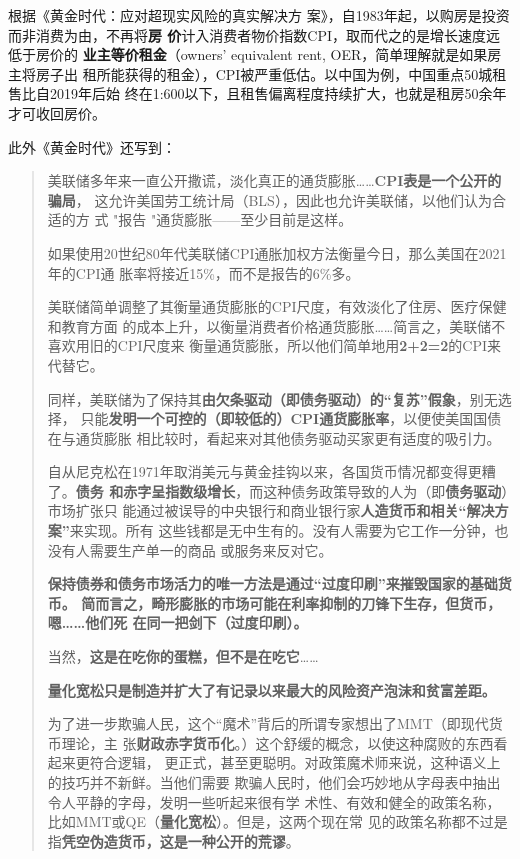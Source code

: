 根据《黄金时代：应对超现实风险的真实解决方
案》\cite{piepenburg2022gold}，自1983年起，以购房是投资而非消费为由，不再将\textbf{房
  价}计入消费者物价指数CPI，取而代之的是增长速度远低于房价的%
\textbf{业主等价租金}（owners’ equivalent rent, OER，简单理解就是如果房主将房子出
租所能获得的租金），CPI被严重低估。以中国为例，中国重点50城租售比自2019年后始
终在1:600以下，且租售偏离程度持续扩大，也就是租房50余年才可收回房价。


此外《黄金时代》还写到：
\begin{quotation}
  美联储多年来一直公开撒谎，淡化真正的通货膨胀……\textbf{CPI表是一个公开的骗局}，
  这允许美国劳工统计局（BLS），因此也允许美联储，以他们认为合适的方
  式 "报告 "通货膨胀——至少目前是这样。

  如果使用20世纪80年代美联储CPI通胀加权方法衡量今日，那么美国在2021年的CPI通
  胀率将接近15\%，而不是报告的6\%多。

  美联储简单调整了其衡量通货膨胀的CPI尺度，有效淡化了住房、医疗保健和教育方面
  的成本上升，以衡量消费者价格通货膨胀……简言之，美联储不喜欢用旧的CPI尺度来
  衡量通货膨胀，所以他们简单地用\textbf{2+2=2}的CPI来代替它。

  同样，美联储为了保持其\textbf{由欠条驱动（即债务驱动）的“复苏”假象}，别无选择，
  只能\textbf{发明一个可控的（即较低的）CPI通货膨胀率}，以便使美国国债在与通货膨胀
  相比较时，看起来对其他债务驱动买家更有适度的吸引力。

  自从尼克松在1971年取消美元与黄金挂钩以来，各国货币情况都变得更糟了。\textbf{债务
    和赤字呈指数级增长}，而这种债务政策导致的人为（即\textbf{债务驱动}）市场扩张只
  能通过被误导的中央银行和商业银行家\textbf{人造货币和相关“解决方案”}来实现。所有
  这些钱都是无中生有的。没有人需要为它工作一分钟，也没有人需要生产单一的商品
  或服务来反对它。

  \textbf{保持债券和债务市场活力的唯一方法是通过“过度印刷”来摧毁国家的基础货币。
    简而言之，畸形膨胀的市场可能在利率抑制的刀锋下生存，但货币，嗯……他们死
    在同一把剑下（过度印刷）。}

  当然，\textbf{这是在吃你的蛋糕，但不是在吃它}……


  \textbf{量化宽松只是制造并扩大了有记录以来最大的风险资产泡沫和贫富差距。}

  为了进一步欺骗人民，这个“魔术”背后的所谓专家想出了MMT（即现代货币理论，主
  张\textbf{财政赤字货币化}。）这个舒缓的概念，以使这种腐败的东西看起来更符合逻辑，
  更正式，甚至更聪明。对政策魔术师来说，这种语义上的技巧并不新鲜。当他们需要
  欺骗人民时，他们会巧妙地从字母表中抽出令人平静的字母，发明一些听起来很有学
  术性、有效和健全的政策名称，比如MMT或QE（\textbf{量化宽松}）。但是，这两个现在常
  见的政策名称都不过是指\textbf{凭空伪造货币，这是一种公开的荒谬}。


\end{quotation}
